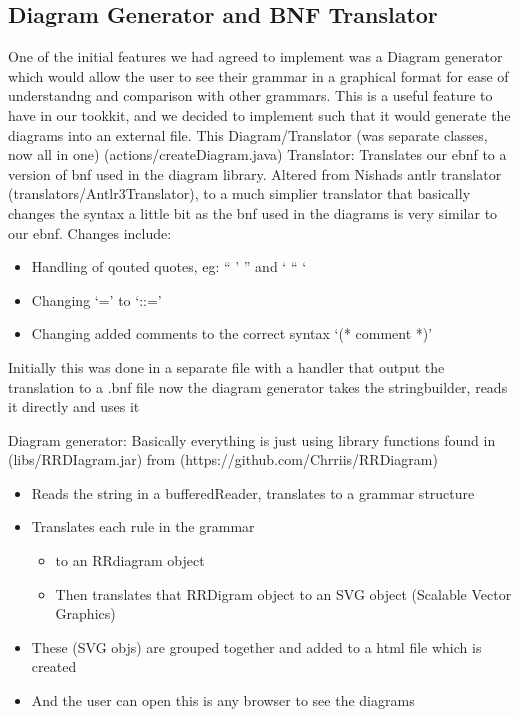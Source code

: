 \subsection{Diagram Generator and BNF Translator}
One of the initial features we had agreed to implement was a Diagram generator which would allow the user to see their grammar in a graphical format for ease of understandng and comparison with other grammars. This is a useful feature to have in our tookkit, and we decided to implement such that it would generate the diagrams into an external file. This 
Diagram/Translator (was separate classes, now all in one) (actions/createDiagram.java)
Translator: Translates our ebnf to a version of bnf used in the diagram library.
Altered from Nishads antlr translator (translators/Antlr3Translator), to a much simplier translator that basically changes the syntax a little bit as the bnf used in the diagrams is very similar to our ebnf.
Changes include:
\begin{itemize}
\item Handling of qouted quotes, eg: “ ’ ” and ‘ “ ‘ 
\item Changing ‘=’ to ‘::=’
\item Changing added comments to the correct syntax ‘(* comment *)’ 
\end{itemize}
Initially this was done in a separate file with a handler that output the translation to a .bnf file now the diagram generator takes the stringbuilder, reads it directly and uses it

Diagram generator: Basically everything is just using library functions found in (libs/RRDIagram.jar) from  (https://github.com/Chrriis/RRDiagram)
\begin{itemize}
\item Reads the string in a bufferedReader, translates to a grammar structure
\item Translates each rule in the grammar 
	\begin{itemize}
	\item to an RRdiagram object
	\item Then translates that RRDigram object to an SVG object (Scalable Vector Graphics) 
	\end{itemize}
\item These (SVG objs) are grouped together and added to a html file which is created 
\item And the user can open this is any browser to see the diagrams 
\end{itemize}


